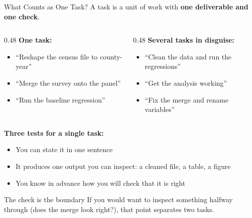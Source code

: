 \documentclass[aspectratio=169, 11pt]{beamer}
\begin{document}
\begin{frame}{What Counts as One Task?}
  \small
  A task is a unit of work with \textbf{one deliverable and one check}.

  \vspace{0.3em}
  \begin{columns}[T]
    \begin{column}{0.48\textwidth}
      \textbf{\color{green!50!black} One task:}
      \begin{itemize}
        \item ``Reshape the census file to county-year''
        \item ``Merge the survey onto the panel''
        \item ``Run the baseline regression''
      \end{itemize}
    \end{column}
    \begin{column}{0.48\textwidth}
      \textbf{\color{red!70!black} Several tasks in disguise:}
      \begin{itemize}
        \item ``Clean the data and run the regressions''
        \item ``Get the analysis working''
        \item ``Fix the merge and rename variables''
      \end{itemize}
    \end{column}
  \end{columns}

  \vspace{0.6em}
  \textbf{Three tests for a single task:}
  \begin{itemize}
    \item You can state it in one sentence
    \item It produces one output you can inspect: a cleaned file, a table, a figure
    \item You know in advance how you will check that it is right
  \end{itemize}

  \vspace{0.3em}
  \begin{alertblock}{The check is the boundary}
    If you would want to inspect something halfway through (does the merge look right?), that point separates two tasks.
  \end{alertblock}
\end{frame}
\end{document}
